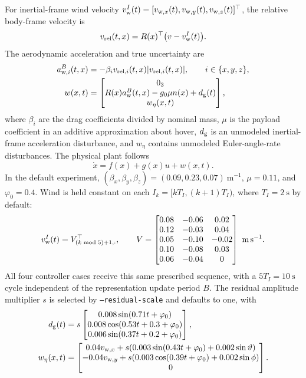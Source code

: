 \documentclass[11pt]{article}
\begin{document}
For inertial-frame wind velocity
$v_{\rm w}^I(t)=[v_{{\rm w},x}(t),v_{{\rm w},y}(t),v_{{\rm w},z}(t)]^\top$,
the relative body-frame velocity is
\begin{equation}
    v_{\rm rel}(t,x)=R(x)^\top\big(v-v_{\rm w}^I(t)\big).
\end{equation}
The aerodynamic acceleration and true uncertainty are
\begin{align}
    a_{{\rm w},i}^B(t,x)&=-\beta_i v_{{\rm rel},i}(t,x)
        |v_{{\rm rel},i}(t,x)|,\qquad i\in\{x,y,z\},\\
    w(x,t)&=\begin{bmatrix}
        0_3\\
        R(x)a_{\rm w}^B(t,x)-g_0\mu n(x)+d_{\rm g}(t)\\
        w_\eta(x,t)
    \end{bmatrix},\label{eq:quad-uncertainty}
\end{align}
where $\beta_i$ are the drag coefficients divided by nominal mass,
$\mu$ is the payload coefficient in an additive approximation about
hover, $d_{\rm g}$ is an unmodeled inertial-frame acceleration disturbance,
and $w_\eta$ contains unmodeled Euler-angle-rate disturbances.
The physical plant follows
\begin{equation}\label{eq:quad-plant}
    \dot x=f(x)+g(x)u+w(x,t).
\end{equation}
In the default experiment,
$(\beta_x,\beta_y,\beta_z)=(0.09,0.23,0.07)~\mathrm{m^{-1}}$,
$\mu=0.11$, and $\varphi_0=0.4$. Wind is held constant on each
$I_k=[kT_I,(k+1)T_I)$, where $T_I=2~\mathrm s$ by default:
\begin{equation}
    v_{\rm w}^I(t)=V_{(k\bmod5)+1,:}^{\top},\qquad
    V=\begin{bmatrix}
      0.08&-0.06&0.02\\0.12&-0.03&0.04\\0.05&-0.10&-0.02\\
      0.10&-0.08&0.03\\0.06&-0.04&0
    \end{bmatrix}~\mathrm{m\,s^{-1}}.
\end{equation}
All four controller cases receive this same prescribed sequence, with a
$5T_I=10~\mathrm s$ cycle independent of the representation update period $B$.
The residual amplitude multiplier $s$ is selected by \texttt{--residual-scale}
and defaults to one, with
\begin{align}
    d_{\rm g}(t)&=s\begin{bmatrix}
        0.008\sin(0.71t+\varphi_0)\\
        0.008\cos(0.53t+0.3+\varphi_0)\\
        0.006\sin(0.37t+0.2+\varphi_0)
    \end{bmatrix},\\
    w_\eta(x,t)&=\begin{bmatrix}
        0.04v_{{\rm w},x}+s(0.003\sin(0.43t+\varphi_0)+0.002\sin\vartheta)\\
        -0.04v_{{\rm w},y}+s(0.003\cos(0.39t+\varphi_0)+0.002\sin\phi)\\
        0
    \end{bmatrix}.
\end{align}
\end{document}
